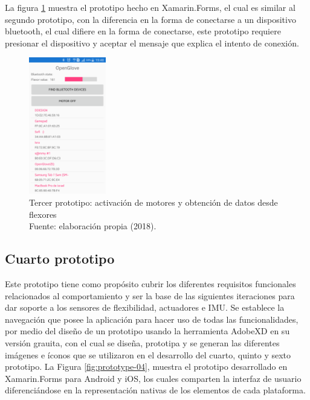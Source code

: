 La figura \ref{fig:prototype-03} muestra el prototipo hecho en Xamarin.Forms, el cual es similar al segundo prototipo, con la diferencia en la forma de conectarse a un dispositivo bluetooth, el cual difiere en la forma de conectarse, este prototipo requiere presionar el dispositivo y aceptar el mensaje que explica el intento de conexión.


\begin{figure}[H]
	\centering
	\captionsetup{justification=centering}
   	\includegraphics[width=0.3\textwidth]{images/chapter03/03-prototype.png} 
            \caption[Tercer prototipo: activación de motores y obtención de datos desde flexores]{Tercer prototipo: activación de motores y obtención de datos desde flexores \\ Fuente: elaboración propia (2018).}
    \label{fig:prototype-03}
\end{figure}


\subsection{Cuarto prototipo}
\label{cuarto-prototipo}
Este prototipo tiene como propósito cubrir los diferentes requisitos funcionales relacionados al comportamiento y ser la base de las siguientes iteraciones para dar soporte a los sensores de flexibilidad, actuadores e IMU. Se establece la navegación que posee la aplicación para hacer uso de todas las funcionalidades, por medio del diseño de un prototipo usando la herramienta AdobeXD en su versión grauita, con el cual se diseña, prototipa y se generan las diferentes imágenes e íconos que se utilizaron en el desarrollo del cuarto, quinto y sexto prototipo. La Figura \ref{fig:prototype-04}, muestra el prototipo desarrollado en Xamarin.Forms para Android y iOS, los cuales comparten la interfaz de usuario diferenciándose en la representación nativas de los elementos de cada plataforma.

